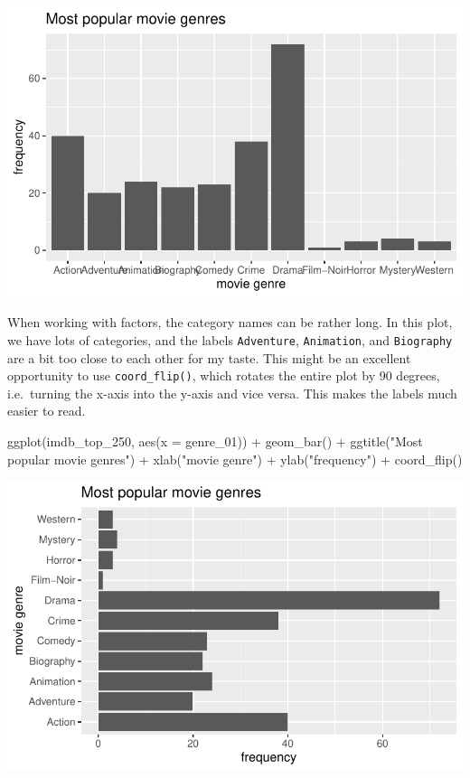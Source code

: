 \documentclass[
  letterpaper,
]{krantz}
\makeatletter
\newenvironment{Shaded}{\begin{snugshade}}{\end{snugshade}}
\newcommand{\AttributeTok}[1]{\textcolor[rgb]{0.40,0.45,0.13}{#1}}
\newcommand{\FunctionTok}[1]{\textcolor[rgb]{0.28,0.35,0.67}{#1}}
\newcommand{\NormalTok}[1]{\textcolor[rgb]{0.00,0.23,0.31}{#1}}
\newcommand{\SpecialCharTok}[1]{\textcolor[rgb]{0.37,0.37,0.37}{#1}}
\newcommand{\StringTok}[1]{\textcolor[rgb]{0.13,0.47,0.30}{#1}}
\newenvironment{kframe}{%
\medskip{}
\setlength{\fboxsep}{.8em}
 \def\at@end@of@kframe{}%
 \ifinner\ifhmode%
  \def\at@end@of@kframe{\end{minipage}}%
  \begin{minipage}{\columnwidth}%
 \fi\fi%
 \def\FrameCommand##1{\hskip\@totalleftmargin \hskip-\fboxsep
 \colorbox{shadecolor}{##1}\hskip-\fboxsep
     \hskip-\linewidth \hskip-\@totalleftmargin \hskip\columnwidth}%
 \MakeFramed {\advance\hsize-\width
   \@totalleftmargin\z@ \linewidth\hsize
   \@setminipage}}%
 {\par\unskip\endMakeFramed%
 \at@end@of@kframe}
\renewenvironment{Shaded}{\begin{kframe}}{\end{kframe}}
\makeatother
\begin{document}
\includegraphics{08_descriptive_statistics_files/figure-pdf/most-popular-bar-plot-and-extras-1.pdf}

When working with factors, the category names can be rather long. In
this plot, we have lots of categories, and the labels
\texttt{Adventure}, \texttt{Animation}, and \texttt{Biography} are a bit
too close to each other for my taste. This might be an excellent
opportunity to use \texttt{coord\_flip()}, which rotates the entire plot
by 90 degrees, i.e.~turning the x-axis into the y-axis and vice versa.
This makes the labels much easier to read.

\begin{Shaded}
\begin{Highlighting}[]
\FunctionTok{ggplot}\NormalTok{(imdb\_top\_250, }\FunctionTok{aes}\NormalTok{(}\AttributeTok{x =}\NormalTok{ genre\_01)) }\SpecialCharTok{+}
  \FunctionTok{geom\_bar}\NormalTok{() }\SpecialCharTok{+}
  \FunctionTok{ggtitle}\NormalTok{(}\StringTok{"Most popular movie genres"}\NormalTok{) }\SpecialCharTok{+}
  \FunctionTok{xlab}\NormalTok{(}\StringTok{"movie genre"}\NormalTok{) }\SpecialCharTok{+}
  \FunctionTok{ylab}\NormalTok{(}\StringTok{"frequency"}\NormalTok{) }\SpecialCharTok{+}
  \FunctionTok{coord\_flip}\NormalTok{()}
\end{Highlighting}
\end{Shaded}

\includegraphics{08_descriptive_statistics_files/figure-pdf/popular-genre-barplot-extras-formatted-1.pdf}
\end{document}
